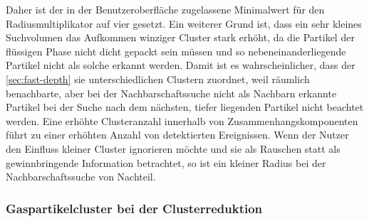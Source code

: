 Daher ist der in der Benutzeroberfläche zugelassene Minimalwert für den Radiusmultiplikator auf vier gesetzt. Ein weiterer Grund ist, dass ein sehr kleines Suchvolumen das Aufkommen winziger Cluster stark erhöht, da die Partikel der flüssigen Phase nicht dicht gepackt sein müssen und so nebeneinanderliegende Partikel nicht als solche erkannt werden. %
Damit ist es wahrscheinlicher, dass der \CFD \autoref{sec:fast-depth} sie unterschiedlichen Clustern zuordnet, weil räumlich benachbarte, aber bei der Nachbarschaftssuche nicht als Nachbarn erkannte Partikel bei der Suche nach dem nächsten, tiefer liegenden Partikel nicht beachtet werden. Eine erhöhte Clusteranzahl innerhalb von Zusammenhangskomponenten führt zu einer erhöhten Anzahl von detektierten Ereignissen. Wenn der Nutzer den Einfluss kleiner Cluster ignorieren möchte und sie als Rauschen statt als gewinnbringende Information betrachtet, so ist ein kleiner Radius bei der Nachbarschaftssuche von Nachteil. %

\subsubsection*{Gaspartikelcluster bei der Clusterreduktion}  %

